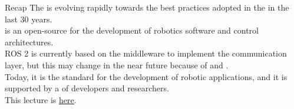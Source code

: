 
\begin{frame}{Recap}
  The  is evolving rapidly towards the best practices adopted in the  in the last 30 years.\\
  \bigskip
   is an open-source  for the development of robotics software and  control architectures.\\
  \bigskip
  ROS 2 is currently based on the  middleware to implement the communication layer, but this may change in the near future because of  and .\\
  \bigskip
  Today, it is the  standard for the development of robotic applications, and it is supported by a  of developers and researchers.\\
  \bigskip
  \bigskip
  This lecture is \href{https://github.com/robmasocco/DAFN24_Robotics_2}{\color{blue}\underline{here}}.
\end{frame}
